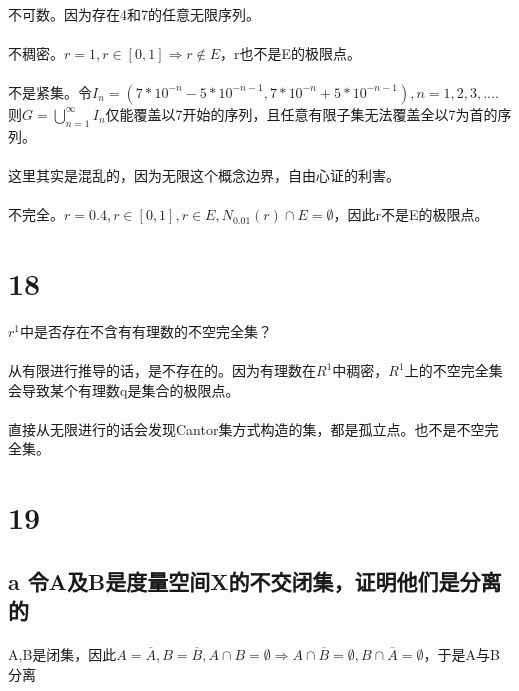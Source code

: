 \paragraph{} 不可数。因为存在4和7的任意无限序列。
\paragraph{} 不稠密。$ r = 1, r \in [0, 1] \Rightarrow r \notin E$，r也不是E的极限点。
\paragraph{} 不是紧集。令$I_n=(7 * 10^{-n} - 5*10^{-n -1}, 7 * 10^{-n} + 5* 10^{-n -1}), n=1, 2, 3, ....$则$G=\bigcup_{n=1}^{\infty}I_n $仅能覆盖以7开始的序列，且任意有限子集无法覆盖全以7为首的序列。
\paragraph{} 这里其实是混乱的，因为无限这个概念边界，自由心证的利害。
\paragraph{} 不完全。$ r= 0.4, r \in [0, 1], r\in E,N_{0.01}(r) \cap E = \emptyset $，因此r不是E的极限点。
\section*{18} $r^1$中是否存在不含有有理数的不空完全集？
\paragraph{} 从有限进行推导的话，是不存在的。因为有理数在$R^1$中稠密，$R^1$上的不空完全集会导致某个有理数q是集合的极限点。
\paragraph{} 直接从无限进行的话会发现Cantor集方式构造的集，都是孤立点。也不是不空完全集。
\section*{19}
\subsection*{a 令A及B是度量空间X的不交闭集，证明他们是分离的}
\paragraph{} A,B是闭集，因此$A=\overline{A}, B=\overline{B}, A\cap B=\emptyset \Rightarrow A \cap \overline{B} = \emptyset , B \cap \overline{A} = \emptyset$，于是A与B分离
